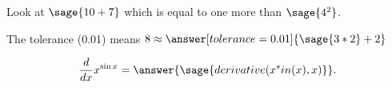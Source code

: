 \documentclass{ximera}
\begin{document}

Look at $\sage{10+7}$ which is equal to one more than $\sage{4^2}$.

 \begin{problem}
   The tolerance (0.01) means $8 \approx \answer[tolerance=0.01]{\sage{3*2}+2}$
 \end{problem}

 \begin{problem}
   \[
     \frac{d}{dx} x^{\sin x} = \answer{\sage{derivative(x^sin(x),x)}}.
   \]
 \end{problem}
\end{document}
